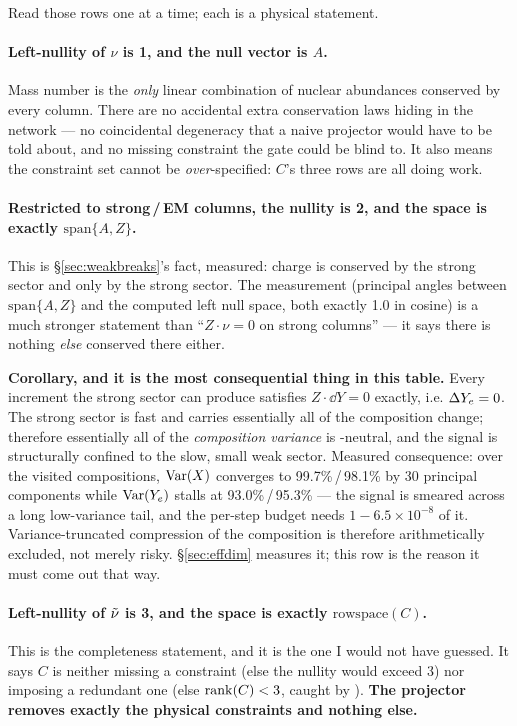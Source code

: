 Read those rows one at a time; each is a physical statement.

\paragraph{Left-nullity of $\nu$ is 1, and the null vector is $A$.} Mass number
is the \emph{only} linear combination of nuclear abundances conserved by every
column. There are no accidental extra conservation laws hiding in the network
--- no coincidental degeneracy that a naive projector would have to be told
about, and no missing constraint the gate could be blind to. It also means the
constraint set cannot be \emph{over}-specified: $C$'s three rows are all doing
work.

\paragraph{Restricted to strong\,/\,EM columns, the nullity is 2, and the space
is exactly $\mathrm{span}\{A, Z\}$.} This is \S\ref{sec:weakbreaks}'s fact,
measured: charge is conserved by the strong sector and only by the strong
sector. The measurement (principal angles between $\mathrm{span}\{A, Z\}$ and
the computed left null space, both exactly 1.0 in cosine) is a much stronger
statement than ``$Z\cdot\nu = 0$ on strong columns'' --- it says there is
nothing \emph{else} conserved there either.

\begin{result}
\textbf{Corollary, and it is the most consequential thing in this table.} Every
increment the strong sector can produce satisfies $Z\cdot \dd Y = 0$ exactly,
i.e. $\Delta Y_{e} = 0$. The strong sector is fast and carries essentially all of the
composition change; therefore essentially all of the \emph{composition variance}
is \Ye-neutral, and the \Ye{} signal is structurally confined to the slow, small
weak sector. Measured consequence: over the visited compositions, $\operatorname*{Var}(X)$
converges to 99.7\%\,/\,98.1\% by 30 principal components while $\operatorname*{Var}(Y_{e})$
stalls at 93.0\%\,/\,95.3\% --- the \Ye{} signal is smeared across a long
low-variance tail, and the per-step budget needs $1 - 6.5\times10^{-8}$ of it.
Variance-truncated compression of the composition is therefore arithmetically
excluded, not merely risky. \S\ref{sec:effdim} measures it; this row is the
reason it must come out that way.
\end{result}

\paragraph{Left-nullity of $\tilde\nu$ is 3, and the space is exactly
$\mathrm{rowspace}(C)$.} This is the completeness statement, and it is the one I
would not have guessed. It says $C$ is neither missing a constraint (else the
nullity would exceed 3) nor imposing a redundant one (else $\operatorname{rank}(C) < 3$,
caught by ). \textbf{The projector removes exactly the
physical constraints and nothing else.}

